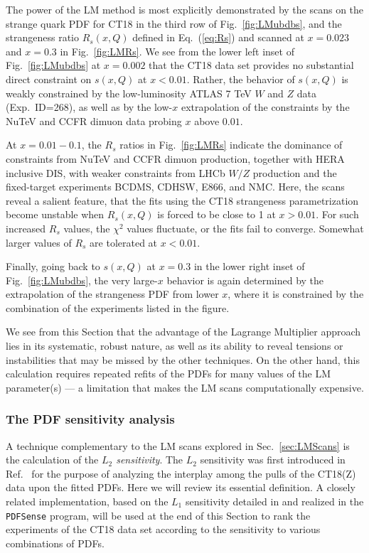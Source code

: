 The power of the LM method is most explicitly
demonstrated by the scans on the strange
quark PDF for CT18 in the third row of Fig.~\ref{fig:LMubdbs}, and the
strangeness ratio $R_s(x,Q)$ defined in Eq.~(\ref{eq:Rs}) and scanned at
$x=0.023$ and $x=0.3$ in Fig.~\ref{fig:LMRs}. We see from the lower
left inset of Fig.~\ref{fig:LMubdbs} at
$x=0.002$ that the CT18 data set provides no substantial direct
constraint on $s(x,Q)$ at $x < 0.01$. Rather, the behavior of $s(x,Q)$ is
weakly constrained by the low-luminosity ATLAS 7 TeV $W$ and $Z$ data
(Exp.~ID=268), as well as by the low-$x$ extrapolation of the constraints by
the NuTeV and CCFR dimuon data probing $x$ above $0.01$.

At $x=0.01\!-\!0.1$, the $R_s$ ratios in Fig.~\ref{fig:LMRs} indicate the
dominance of constraints from NuTeV and CCFR dimuon production,
together with HERA inclusive DIS, with weaker constraints from
LHCb $W/Z$ production
and the fixed-target experiments BCDMS, CDHSW, E866, and NMC. Here, the scans
reveal a salient feature, that the fits using the CT18
strangeness parametrization become unstable when $R_s(x,Q)$ is forced
to be close to 1 at $x > 0.01$. For such increased $R_s$ values, the
$\chi^2$ values fluctuate, or the fits fail to converge. Somewhat
larger values of $R_s$ are tolerated at $x < 0.01$. 

Finally, going back to $s(x,Q)$ at $x=0.3$ in the lower right inset of
Fig.~\ref{fig:LMubdbs}, the very large-$x$ behavior is again
determined by the extrapolation of the strangeness PDF from lower $x$,
where it is constrained by the combination of the experiments listed
in the figure. 

We see from this Section that the advantage of the Lagrange Multiplier approach lies in its systematic, robust nature, as well as its ability to reveal tensions or
instabilities that may be missed by the other techniques.
On the other hand, this calculation requires repeated refits
of the PDFs for many values of the LM parameter(s) ---
a limitation that makes the LM scans computationally expensive.

%
\subsubsection{The PDF sensitivity analysis
\label{sec:L2}
}
%
A technique complementary to the LM scans explored in Sec.~\ref{sec:LMScans}
is the calculation of the {\it $L_2$ sensitivity}. The $L_2$ sensitivity was
first introduced in Ref.~\cite{Hobbs:2019gob} for the purpose of analyzing
the interplay among the pulls of the CT18(Z) data upon the fitted PDFs.
Here we will review its essential definition. A closely related
implementation, based on the $L_1$ sensitivity detailed
in \cite{Wang:2018heo} and realized in the \texttt{PDFSense} program,
will be used at the end of this Section to rank the experiments of the
CT18 data set according to the sensitivity to various combinations of PDFs.
  
